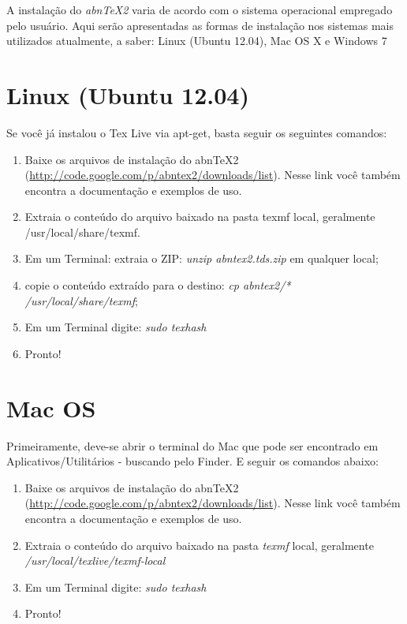 A instalação do \emph{abnTeX2} varia de acordo com o sistema operacional empregado pelo usuário. Aqui serão apresentadas as formas de instalação nos sistemas mais utilizados atualmente, a saber: Linux (Ubuntu 12.04), Mac OS X e Windows 7

\section{Linux (Ubuntu 12.04)}

Se você já instalou o Tex Live via apt-get, basta seguir os seguintes comandos:

\begin{enumerate}

\item Baixe os arquivos de instalação do abnTeX2 (\url{http://code.google.com/p/abntex2/downloads/list}). Nesse link você também encontra a documentação e exemplos de uso.
\item Extraia o conteúdo do arquivo baixado na pasta texmf local, geralmente /usr/local/share/texmf. 
\item Em um Terminal: extraia o ZIP: \emph{unzip abntex2.tds.zip} em qualquer local;
\item copie o conteúdo extraído para o destino: \emph{cp abntex2/* /usr/local/share/texmf};
\item Em um Terminal digite: \emph{sudo texhash}
\item Pronto!
\end{enumerate}

\section{Mac OS}

Primeiramente, deve-se abrir o terminal do Mac que pode ser encontrado em Aplicativos/Utilitários - buscando pelo Finder.  E seguir os comandos abaixo:
\begin{enumerate}
\item Baixe os arquivos de instalação do abnTeX2 (\url{http://code.google.com/p/abntex2/downloads/list}). Nesse link você também encontra a documentação e exemplos de uso.
\item Extraia o conteúdo do arquivo baixado na pasta \emph{texmf} local, geralmente \emph{/usr/local/texlive/texmf-local}
\item Em um Terminal digite: \emph{sudo texhash}
\item Pronto!
\end{enumerate}
 
